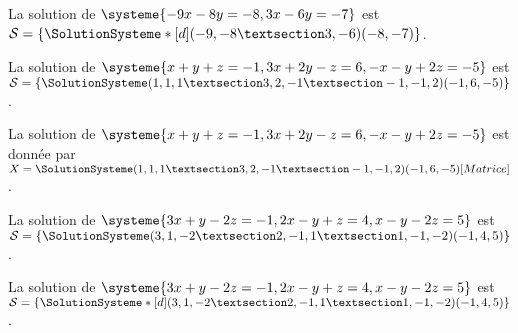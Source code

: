 \documentclass[french,a4paper,10pt]{article}
\begin{document}
\begin{ShowCodeTeX}
La solution de $\systeme{-9x-8y=-8,3x-6y=-7}$ est $\mathcal{S}=%
\left\lbrace \SolutionSysteme*[d](-9,-8 § 3,-6)(-8,-7) \right\rbrace$.
\end{ShowCodeTeX}

\begin{ShowCodeTeX}
La solution de $\systeme{x+y+z=-1,3x+2y-z=6,-x-y+2z=-5}$ est $\mathcal{S}=%
\left\lbrace \SolutionSysteme(1,1,1 § 3,2,-1 § -1,-1,2)(-1,6,-5) \right\rbrace$.
\end{ShowCodeTeX}

\begin{ShowCodeTeX}
La solution de $\systeme{x+y+z=-1,3x+2y-z=6,-x-y+2z=-5}$ est donnée par $X=%
\SolutionSysteme(1,1,1 § 3,2,-1 § -1,-1,2)(-1,6,-5)[Matrice]$.
\end{ShowCodeTeX}

\begin{ShowCodeTeX}
La solution de $\systeme{3x+y-2z=-1,2x-y+z=4,x-y-2z=5}$ est $\mathcal{S}=%
\left\lbrace \SolutionSysteme(3,1,-2 § 2,-1,1 § 1,-1,-2)(-1,4,5) \right\rbrace$.
\end{ShowCodeTeX}

\begin{ShowCodeTeX}
La solution de $\systeme{3x+y-2z=-1,2x-y+z=4,x-y-2z=5}$ est $\mathcal{S}=%
\left\lbrace \SolutionSysteme*[d](3,1,-2 § 2,-1,1 § 1,-1,-2)(-1,4,5) \right\rbrace$.
\end{ShowCodeTeX}
\end{document}
